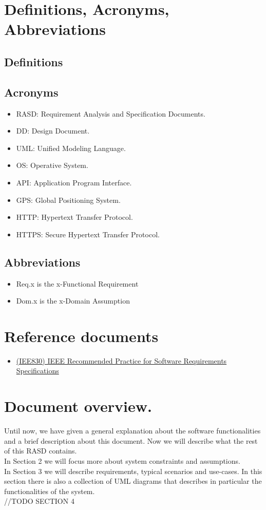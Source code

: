 \documentclass{report}
\begin{document}
	\section{Definitions, Acronyms, Abbreviations}
		
		\subsection{Definitions}

		\subsection{Acronyms}
			\begin{itemize}
				\item RASD: Requirement Analysis and Specification Documents.
				\item DD: Design Document.
				\item UML: Unified Modeling Language.
				\item OS: Operative System.
				\item API: Application Program Interface.
				\item GPS: Global Positioning System.
				\item HTTP: Hypertext Transfer Protocol.
				\item HTTPS: Secure Hypertext Transfer Protocol.
			\end{itemize}

		\subsection{Abbreviations}
			\begin{itemize}
				\item Req.x is the x-Functional Requirement
				\item Dom.x is the x-Domain Assumption
			\end{itemize}
		
	\section{Reference documents}
		\begin{itemize}
			\item \href{http://www.math.uaa.alaska.edu/~afkjm/cs401/IEEE830.pdf}{(IEE830) IEEE Recommended Practice for Software Requirements Specifications}
		\end{itemize}
		
	\section{Document overview.}
	Until now, we have given a general explanation about the software functionalities and a brief description about this document. Now we will describe what the rest of this RASD contains.\\
	In Section 2 we will focus more about system constraints and assumptions.\\
	In Section 3 we will describe requirements, typical scenarios and use-cases. In this section there is also a collection of UML diagrams that describes in particular the functionalities of the system.\\
	//TODO SECTION 4
		
\end{document}
